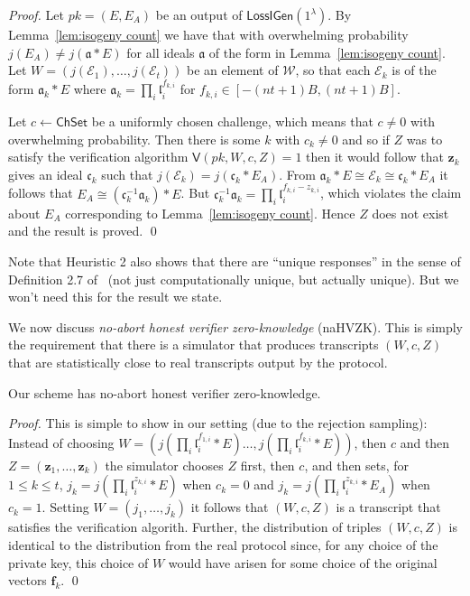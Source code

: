 \documentclass{llncs}
\newcommand{\E}{\mathcal{E}}
\renewcommand{\a}{\mathfrak{a}}
\renewcommand{\c}{\mathfrak{c}}
\renewcommand{\l}{\mathfrak{l}}
\newcommand{\f}{\mathbf{f}}
\newcommand{\z}{\mathbf{z}}
\newcommand{\VV}{\mathsf{V}}
\newcommand{\Wset}{\mathcal{W}}
\newcommand{\ChSet}{\textsf{ChSet}}
\newcommand{\LossIGen}{\mathsf{LossIGen}}
\begin{document}
\begin{proof}
Let $pk = (E, E_A )$ be an output of $\LossIGen( 1^\lambda )$.
By Lemma~\ref{lem:isogeny count} we have that with overwhelming probability $j(E_A) \ne j( \a * E )$ for all ideals $\a$ of the form in Lemma~\ref{lem:isogeny count}.
Let $W = (j(\E_1), \dots, j(\E_t) )$ be an element of $\Wset$, so that each $\E_k$ is of the form $\a_k * E$ where $\a_k = \prod_i \l_i^{f_{k,i}}$ for $f_{k,i} \in [-(nt+1)B, (nt+1)B ]$.


Let $c \leftarrow \ChSet$ be a uniformly chosen challenge, which means that $c \ne 0$ with overwhelming probability.
Then there is some $k$ with $c_k \ne 0$ and so if $Z$ was to satisfy the verification algorithm
$\VV( pk, W, c, Z ) = 1$ then it would follow that $\z_k$ gives an ideal $\c_k$ such that $j(\E_k) = j( \c_k * E_A )$.
From $\a_k * E  \cong \E_k \cong \c_k * E_A$ it follows that $E_A \cong (\c_k^{-1} \a_k ) * E$.
But $\c_k^{-1} \a_k = \prod_i \l_i^{f_{k,i} - z_{k,i}}$, which violates the claim about $E_A$ corresponding to Lemma~\ref{lem:isogeny count}. Hence $Z$ does not exist and the result is proved. \qed
\end{proof}


Note that Heuristic 2 also shows that there are ``unique responses'' in the sense of Definition 2.7 of~\cite{KLS18} (not just computationally unique, but actually unique). But we won't need this for the result we state.


We now discuss \emph{no-abort honest verifier zero-knowledge} (naHVZK).
This is simply the requirement that there is a simulator that produces transcripts $(W,c,Z)$ that are statistically close to real transcripts output by the protocol.


\begin{lemma}
Our scheme has no-abort honest verifier zero-knowledge.
\end{lemma}

\begin{proof}
This is simple to show in our setting (due to the rejection sampling): Instead of choosing $W = ( j(\prod_i \l_i^{f_{1,i}} * E) \dots, j( \prod_i \l_i^{f_{k,i}} * E ))$, then $c$ and then $Z = (\z_1, \dots, \z_k)$ the simulator chooses $Z$ first, then $c$, and then sets, for $1 \le k \le t$, $j_k = j( \prod_i \l_i^{z_{k,i}} * E )$ when $c_k=0$ and $j_k = j( \prod_i \l_i^{z_{k,i}} * E_A )$ when $c_k = 1$.
Setting $W = (j_1,\dots, j_k)$ it follows that $(W, c, Z )$ is a transcript that satisfies the verification algorith.
Further, the distribution of triples $(W,c,Z)$ is identical to the distribution from the real protocol since, for any choice of the private key, this choice of $W$ would have arisen for some choice of the original vectors $\f_k$. \qed
\end{proof}
\end{document}
